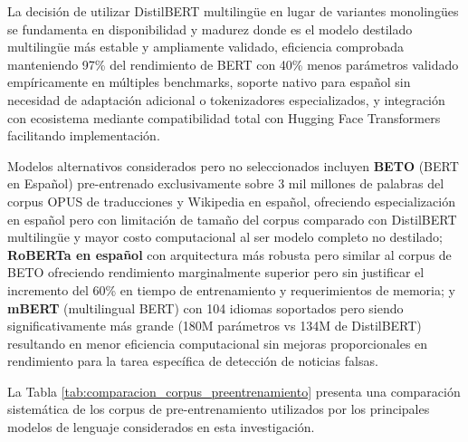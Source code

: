 La decisión de utilizar DistilBERT multilingüe en lugar de variantes monolingües se fundamenta en disponibilidad y madurez donde es el modelo destilado multilingüe más estable y ampliamente validado, eficiencia comprobada manteniendo 97\% del rendimiento de BERT con 40\% menos parámetros validado empíricamente en múltiples benchmarks, soporte nativo para español sin necesidad de adaptación adicional o tokenizadores especializados, y integración con ecosistema mediante compatibilidad total con Hugging Face Transformers facilitando implementación.

Modelos alternativos considerados pero no seleccionados incluyen \textbf{BETO} (BERT en Español) pre-entrenado exclusivamente sobre 3 mil millones de palabras del corpus OPUS de traducciones y Wikipedia en español, ofreciendo especialización en español pero con limitación de tamaño del corpus comparado con DistilBERT multilingüe y mayor costo computacional al ser modelo completo no destilado; \textbf{RoBERTa en español} con arquitectura más robusta pero similar al corpus de BETO ofreciendo rendimiento marginalmente superior pero sin justificar el incremento del 60\% en tiempo de entrenamiento y requerimientos de memoria; y \textbf{mBERT} (multilingual BERT) con 104 idiomas soportados pero siendo significativamente más grande (180M parámetros vs 134M de DistilBERT) resultando en menor eficiencia computacional sin mejoras proporcionales en rendimiento para la tarea específica de detección de noticias falsas.

La Tabla \ref{tab:comparacion_corpus_preentrenamiento} presenta una comparación sistemática de los corpus de pre-entrenamiento utilizados por los principales modelos de lenguaje considerados en esta investigación.

